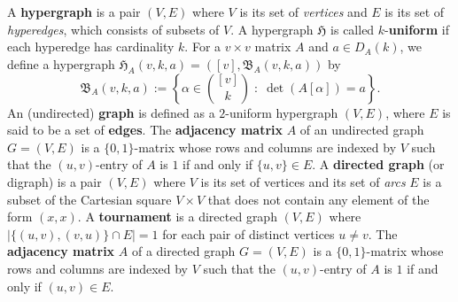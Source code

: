 \documentclass[11pt]{article}
\begin{document}
A \textbf{hypergraph} is a pair $(V,E)$ where $V$ is its set of \textit{vertices} and $E$ is its set of \textit{hyperedges}, which consists of subsets of $V$.
A hypergraph $\mathfrak H$ is called $k$-\textbf{uniform} if each hyperedge has cardinality $k$.
For a $v\times v$ matrix $A$ and $a\in D_A(k)$, we define a hypergraph $\mathfrak H_{A}(v,k,a)=([v],\mathfrak B_A(v,k,a))$ by 
  \[\mathfrak B_A(v,k,a):=\left\{\alpha\in \binom{[v]}{k} \; : \;  \det (A[\alpha])=a \right\}.\]
An (undirected) \textbf{graph} is defined as a $2$-uniform hypergraph $(V,E)$, where $E$ is said to be a set of \textbf{edges}. 
The \textbf{adjacency matrix} $A$ of an undirected graph $G = (V,E)$ is a $\{0,1\}$-matrix whose rows and columns are indexed by $V$ such that the $(u,v)$-entry of $A$ is $1$ if and only if $\{u,v\} \in E$.
A \textbf{directed graph} (or digraph) is a pair $(V,E)$ where $V$ is its set of vertices and its set of \textit{arcs} $E$ is a subset of the Cartesian square $V \times V$ that does not contain any element of the form $(x,x)$.
A \textbf{tournament} is a directed graph $(V,E)$ where $|\{ (u,v),(v,u)\} \cap E| = 1$ for each pair of distinct vertices $u \ne v$.
The \textbf{adjacency matrix} $A$ of a directed graph $G = (V,E)$ is a $\{0,1\}$-matrix whose rows and columns are indexed by $V$ such that the $(u,v)$-entry of $A$ is $1$ if and only if $(u,v) \in E$.
\end{document}
